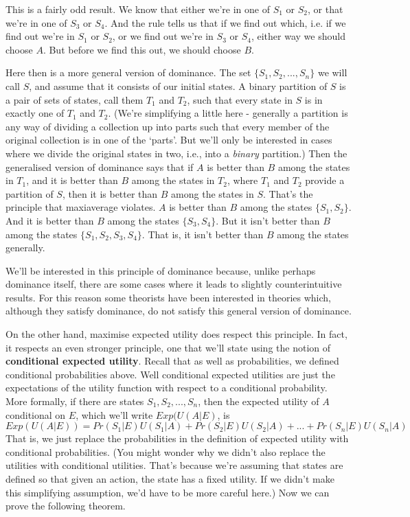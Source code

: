 This is a fairly odd result. We know that either we're in one of $S_1$ or $S_2$, or that we're in one of $S_3$ or $S_4$. And the rule tells us that if we find out which, i.e. if we find out we're in $S_1$ or $S_2$, or we find out we're in $S_3$ or $S_4$, either way we should choose $A$. But before we find this out, we should choose $B$.

Here then is a more general version of dominance. The set $\{S_1, S_2, ..., S_n\}$ we will call $S$, and assume that it consists of our initial states. A binary partition of $S$ is a pair of sets of states, call them $T_1$ and $T_2$, such that every state in $S$ is in exactly one of $T_1$ and $T_2$. (We're simplifying a little here - generally a partition is any way of dividing a collection up into parts such that every member of the original collection is in one of the `parts'. But we'll only be interested in cases where we divide the original states in two, i.e., into a \textit{binary} partition.)  Then the generalised version of dominance says that if $A$ is better than $B$ among the states in $T_1$, and it is better than $B$ among the states in $T_2$, where $T_1$ and $T_2$ provide a partition of $S$, then it is better than $B$ among the states in $S$.  That's the principle that maxiaverage violates. $A$ is better than $B$ among the states $\{S_1, S_2\}$. And it is better than $B$ among the states $\{S_3, S_4\}$. But it isn't better than $B$ among the states $\{S_1, S_2, S_3, S_4\}$. That is, it isn't better than $B$ among the states generally.

We'll be interested in this principle of dominance because, unlike perhaps dominance itself, there are some cases where it leads to slightly counterintuitive results. For this reason some theorists have been interested in theories which, although they satisfy dominance, do not satisfy this general version of dominance.

On the other hand, maximise expected utility does respect this principle. In fact, it respects an even stronger principle, one that we'll state using the notion of \textbf{conditional expected utility}. Recall that as well as probabilities, we defined conditional probabilities above. Well conditional expected utilities are just the expectations of the utility function with respect to a conditional probability. More formally, if there are states $S_1, S_2, ..., S_n$, then the expected utility of $A$ conditional on $E$, which we'll write $Exp(U(A | E)$, is
\begin{equation*}
Exp(U(A|E)) = Pr(S_1|E) U(S_1|A) + Pr(S_2|E) U(S_2|A) + ... + Pr(S_n|E) U(S_n|A)
\end{equation*}
\noindent That is, we just replace the probabilities in the definition of expected utility with conditional probabilities. (You might wonder why we didn't also replace the utilities with conditional utilities. That's because we're assuming that states are defined so that given an action, the state has a fixed utility. If we didn't make this simplifying assumption, we'd have to be more careful here.) Now we can prove the following theorem.

